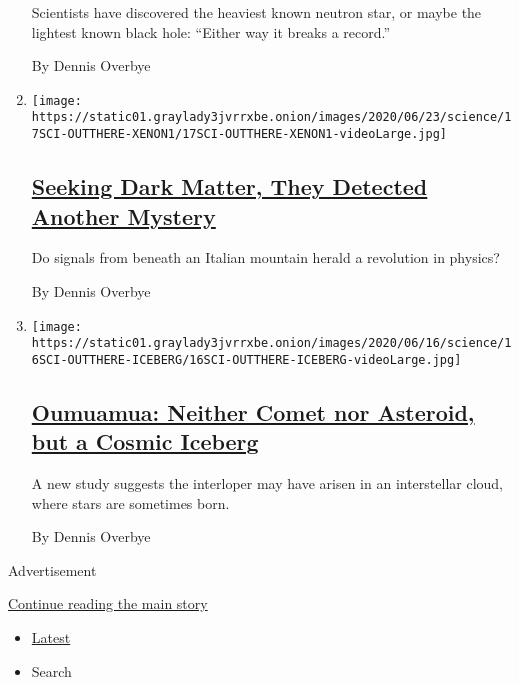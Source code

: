 \begin{enumerate}
  Scientists have discovered the heaviest known neutron star, or maybe
  the lightest known black hole: ``Either way it breaks a record.''

  By Dennis Overbye
\item
  \texttt{[image: https://static01.graylady3jvrrxbe.onion/images/2020/06/23/science/17SCI-OUTTHERE-XENON1/17SCI-OUTTHERE-XENON1-videoLarge.jpg]}

  \hypertarget{seeking-dark-matter-they-detected-another-mystery}{%
  \subsection{\texorpdfstring{\href{/2020/06/17/science/xenon-axions-neutrinos-tritium.html}{Seeking
  Dark Matter, They Detected Another
  Mystery}}{Seeking Dark Matter, They Detected Another Mystery}}\label{seeking-dark-matter-they-detected-another-mystery}}

  Do signals from beneath an Italian mountain herald a revolution in
  physics?

  By Dennis Overbye
\item
  \texttt{[image: https://static01.graylady3jvrrxbe.onion/images/2020/06/16/science/16SCI-OUTTHERE-ICEBERG/16SCI-OUTTHERE-ICEBERG-videoLarge.jpg]}

  \hypertarget{oumuamua-neither-comet-nor-asteroid-but-a-cosmic-iceberg}{%
  \subsection{\texorpdfstring{\href{/2020/06/15/science/oumuamua-astronomy-comets.html}{Oumuamua:
  Neither Comet nor Asteroid, but a Cosmic
  Iceberg}}{Oumuamua: Neither Comet nor Asteroid, but a Cosmic Iceberg}}\label{oumuamua-neither-comet-nor-asteroid-but-a-cosmic-iceberg}}

  A new study suggests the interloper may have arisen in an interstellar
  cloud, where stars are sometimes born.

  By Dennis Overbye
\end{enumerate}

Advertisement

\protect\hyperlink{after-mid2}{Continue reading the main story}

\begin{itemize}
\tightlist
\item
  \protect\hyperlink{stream-panel}{Latest}
\item
  Search
\end{itemize}

